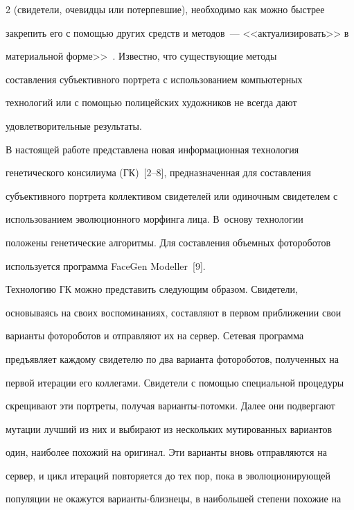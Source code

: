 \begin{multicols}{2}
(свидетели, очевидцы или потерпевшие), необходимо как можно быст\-рее 


закрепить его с помощью других средств и методов~--- <<актуализировать>> в 


материальной форме>>~\cite{1pr}. Известно, что существующие методы 


со\-став\-ле\-ния субъективного портрета с использованием компьютерных 


технологий или с помощью полицейских художников не всегда дают 


удовлетворительные результаты. 


     


     В настоящей работе представлена новая информационная технология 


генетического консилиума (ГК)~[2--8], предназначенная для составления 


субъективного портрета коллективом свидетелей или одиночным свидетелем с 


использованием эволюционного морфинга лица. В~основу технологии 


положены генетические алгоритмы. Для составления объемных фотороботов 


используется программа FaceGen Modeller~[9]. 


     


     Технологию ГК можно представить следующим образом. Свидетели, 


основываясь на своих воспоминаниях, составляют в первом приближении свои 


варианты фотороботов и отправляют их на сервер. Сетевая программа 


предъявляет каждому свидетелю по два варианта фотороботов, полученных на 


первой итерации его коллегами. Свидетели с помощью специальной процедуры 


скрещивают эти портреты, получая варианты-потомки. Далее они подвергают 


мутации лучший из них и выбирают из нескольких мутированных вариантов 


один, наиболее похожий на оригинал. Эти варианты вновь отправляются на 


сервер, и цикл итераций повторяется до тех пор, пока в эво\-лю\-цио\-ни\-ру\-ющей 


популяции не окажутся варианты-близнецы, в наибольшей степени похожие на 



\end{multicols}
